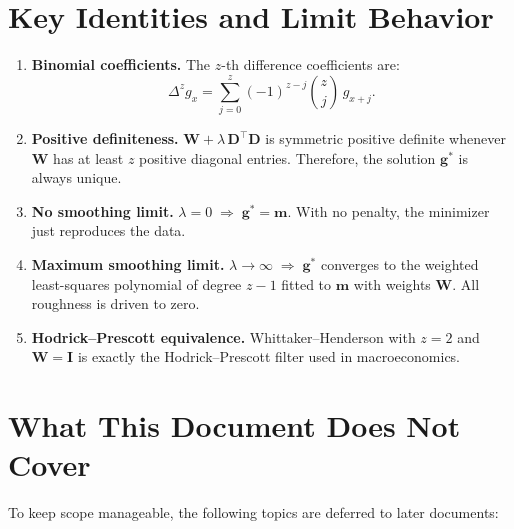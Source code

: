 \documentclass[11pt,a4paper]{article}
\begin{document}
\section{Key Identities and Limit Behavior}

\begin{formaldef}
\begin{enumerate}[nosep,label=(\roman*)]
  \item \textbf{Binomial coefficients.}  The $z$-th difference coefficients are:
  \[
    \Delta^z g_x = \sum_{j=0}^{z} (-1)^{z-j}\binom{z}{j}\,g_{x+j}.
  \]

  \item \textbf{Positive definiteness.}  $\bm{W} + \lambda\,\bm{D}^\top\bm{D}$ is symmetric positive definite whenever $\bm{W}$ has at least $z$ positive diagonal entries.  Therefore, the solution $\bm{g}^*$ is always unique.

  \item \textbf{No smoothing limit.}  $\lambda = 0 \;\Longrightarrow\; \bm{g}^* = \bm{m}$.  With no penalty, the minimizer just reproduces the data.

  \item \textbf{Maximum smoothing limit.}  $\lambda \to \infty \;\Longrightarrow\; \bm{g}^*$ converges to the weighted least-squares polynomial of degree $z-1$ fitted to $\bm{m}$ with weights $\bm{W}$.  All roughness is driven to zero.

  \item \textbf{Hodrick--Prescott equivalence.}  Whittaker--Henderson with $z=2$ and $\bm{W} = \bm{I}$ is exactly the Hodrick--Prescott filter used in macroeconomics.
\end{enumerate}
\end{formaldef}

\section{What This Document Does Not Cover}

To keep scope manageable, the following topics are deferred to later documents:
\end{document}
